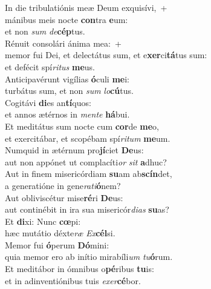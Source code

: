 \evenverse In die tribulatiónis meæ Deum exquisívi,~+\\\evenverse  mánibus meis nocte \textbf{con}tra \textbf{e}um:~\*\\
\evenverse et non \textit{sum} \textit{de}\textbf{cép}tus.\\
\oddverse Rénuit consolári ánima mea:~+\\
\oddverse  memor fui Dei, et delectátus sum, et e\textbf{xer}ci\textbf{tá}tus sum:~\*\\
\oddverse et defécit spí\textit{ri}\textit{tus} \textbf{me}us.\\
\evenverse Anticipavérunt vigílias \textbf{ó}culi \textbf{me}i:~\*\\
\evenverse turbátus sum, et non \textit{sum} \textit{lo}\textbf{cú}tus.\\
\oddverse Cogitávi \textbf{di}es an\textbf{tí}quos:~\*\\
\oddverse et annos ætérnos in \textit{men}\textit{te} \textbf{há}bui.\\
\evenverse Et meditátus sum nocte cum \textbf{cor}de \textbf{me}o,~\*\\
\evenverse et exercitábar, et scopébam spí\textit{ri}\textit{tum} \textbf{me}um.\\
\oddverse Numquid in ætérnum pro\textbf{jí}ciet \textbf{De}us:~\*\\
\oddverse aut non appónet ut complacíti\textit{or} \textit{sit} \textbf{a}dhuc?\\
\evenverse Aut in finem misericórdiam \textbf{su}am ab\textbf{scín}det,~\*\\
\evenverse a generatióne in gene\textit{ra}\textit{ti}\textbf{ó}nem?\\
\oddverse Aut obliviscétur mise\textbf{ré}ri \textbf{De}us:~\*\\
\oddverse aut continébit in ira sua misericór\textit{di}\textit{as} \textbf{su}as?\\
\evenverse Et \textbf{di}xi: Nunc \textbf{cœ}pi:~\*\\
\evenverse hæc mutátio déxte\textit{ræ} \textit{Ex}\textbf{cél}si.\\
\oddverse Memor fui \textbf{ó}perum \textbf{Dó}mini:~\*\\
\oddverse quia memor ero ab inítio mirabíli\textit{um} \textit{tu}\textbf{ó}rum.\\
\evenverse Et meditábor in ómnibus o\textbf{pé}ribus \textbf{tu}is:~\*\\
\evenverse et in adinventiónibus tuis \textit{e}\textit{xer}\textbf{cé}bor.\\
